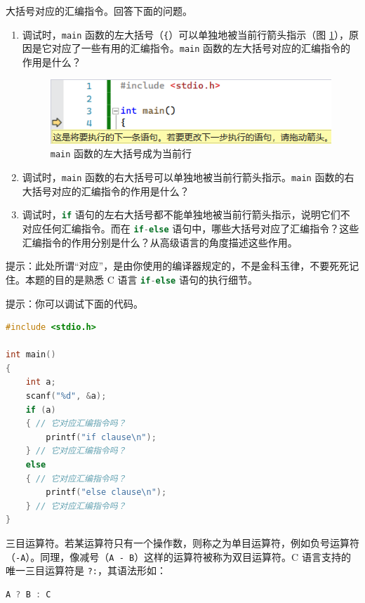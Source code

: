 \begin{problemset}
	\item 大括号对应的汇编指令。回答下面的问题。

	\begin{enumerate}
		\item 调试时，\lstinline{main} 函数的左大括号（\lstinline{{}）可以单独地被当前行箭头指示（图 \ref{pic:brace}），原因是它对应了一些有用的汇编指令。\lstinline{main} 函数的左大括号对应的汇编指令的作用是什么？

		\begin{figure}[H]
			\centering
			\includegraphics[width=0.75\linewidth]{pic/brace.png}
			\caption{\lstinline{main} 函数的左大括号成为当前行}
			\label{pic:brace}
		\end{figure}

		\item 调试时，\lstinline{main} 函数的右大括号可以单独地被当前行箭头指示。\lstinline{main} 函数的右大括号对应的汇编指令的作用是什么？

		\item 调试时，\lstinline[language=c]{if} 语句的左右大括号都不能单独地被当前行箭头指示，说明它们不对应任何汇编指令。而在 \lstinline[language=c]{if-else} 语句中，哪些大括号对应了汇编指令？这些汇编指令的作用分别是什么？从高级语言的角度描述这些作用。
	\end{enumerate}

	提示：此处所谓“对应”，是由你使用的编译器规定的，不是金科玉律，不要死死记住。本题的目的是熟悉 C 语言 \lstinline[language=c]{if-else} 语句的执行细节。

	提示：你可以调试下面的代码。

		\begin{lstlisting}[language=c]
#include <stdio.h>

int main()
{
	int a;
	scanf("%d", &a);
	if (a)
	{ // 它对应汇编指令吗？
		printf("if clause\n");
	} // 它对应汇编指令吗？
	else
	{ // 它对应汇编指令吗？
		printf("else clause\n");
	} // 它对应汇编指令吗？
}
		\end{lstlisting}

	\item 三目运算符。若某运算符只有一个操作数，则称之为单目运算符，例如负号运算符（\lstinline{-A}）。同理，像减号（\lstinline{A - B}）这样的运算符被称为双目运算符。C 语言支持的唯一三目运算符是 \lstinline{?:}，其语法形如：
	\begin{lstlisting}[language=c, numbers=none]
A ? B : C
	\end{lstlisting}


\end{problemset}
